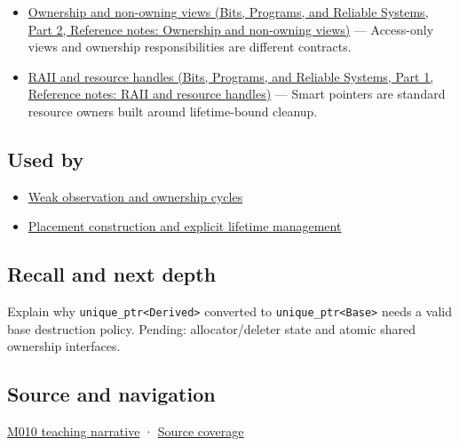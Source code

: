 \begin{itemize}
\tightlist
\item
  \href{../01-Bits-Programs-and-Reliable-Systems-P02/main.pdf\#nameddest=appendix-d52e4486f527}{Ownership and non-owning views (Bits, Programs, and Reliable Systems, Part 2, Reference notes: Ownership and non-owning views)} --- Access-only views and ownership responsibilities are different contracts.
\item
  \href{../01-Bits-Programs-and-Reliable-Systems-P01/main.pdf\#nameddest=appendix-69739d3ab49b}{RAII and resource handles (Bits, Programs, and Reliable Systems, Part 1, Reference notes: RAII and resource handles)} --- Smart pointers are standard resource owners built around lifetime-bound cleanup.
\end{itemize}

\subsection{Used by}\label{appendix-51602cabe815-used-by}

\hypertarget{appendix-51602cabe815-used-by}{}

\begin{itemize}
\tightlist
\item
  \hyperref[appendix-b9548675eb2b]{Weak observation and ownership cycles}
\item
  \hyperref[appendix-f56c3e43fd4e]{Placement construction and explicit lifetime management}
\end{itemize}

\subsection{Recall and next depth}\label{appendix-51602cabe815-recall-and-next-depth}

\hypertarget{appendix-51602cabe815-recall-and-next-depth}{}

Explain why \texttt{unique\_ptr\textless{}Derived\textgreater{}} converted to \texttt{unique\_ptr\textless{}Base\textgreater{}} needs a valid base destruction policy. Pending: allocator/deleter state and atomic shared ownership interfaces.

\subsection{Source and navigation}\label{appendix-51602cabe815-source-and-navigation}

\hypertarget{appendix-51602cabe815-source-and-navigation}{}

\hyperref[01-foundations-i-ch004-exclusive-ownership-unique_ptr-makes-transfer-visible]{M010 teaching narrative} · \hyperref[appendix-fd090d982a15-m010---parts-148-160]{Source coverage}
